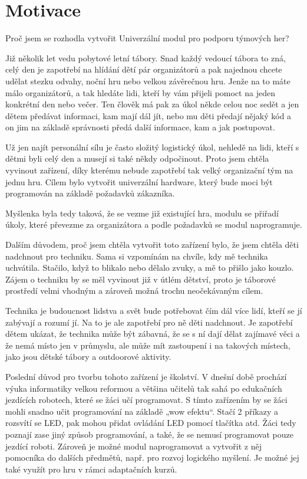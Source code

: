 \chapter{Motivace}
Proč jsem se rozhodla vytvořit Univerzální modul pro podporu týmových her? 

Již několik let vedu pobytové letní tábory. Snad každý vedoucí tábora to zná, celý den je zapotřebí na hlídání dětí pár organizátorů 
a pak najednou chcete udělat stezku odvahy, noční hru nebo velkou závěrečnou hru. Jenže na to máte málo organizátorů, a tak hledáte lidi, 
kteří by vám přijeli pomoct na jeden konkrétní den nebo večer. Ten člověk má pak za úkol někde celou noc sedět a jen dětem předávat 
informaci, kam mají dál jít, nebo mu děti předají nějaký kód a on jim na základě správnosti předá další informace, kam a jak postupovat. 

Už jen najít personální sílu je často složitý logistický úkol, nehledě na lidi, kteří s dětmi byli celý den a musejí si také někdy 
odpočinout. Proto jsem chtěla vyvinout zařízení, díky kterému nebude zapotřebí tak velký organizační tým na jednu hru. Cílem bylo vytvořit 
univerzální hardware, který bude moci být programován na základě požadavků zákazníka. 

Myšlenka byla tedy taková, že se vezme již existující hra, modulu se přiřadí úkoly, které převezme za organizátora a podle požadavků se 
 modul naprogramuje. 

Dalším důvodem, proč jsem chtěla vytvořit toto zařízení bylo, že jsem chtěla děti nadchnout pro techniku. Sama si vzpomínám na chvíle, kdy
mě technika uchvátila. Stačilo, když to blikalo nebo dělalo zvuky, a mě to přišlo jako kouzlo. Zájem o techniku by se měl vyvinout již v útlém 
dětství, proto je táborové prostředí velmi vhodným a zároveň možná trochu neočekávaným cílem. 

Technika je budoucnost lidstva a svět bude potřebovat čím dál více lidí, kteří se jí zabývají a rozumí jí. Na to je ale zapotřebí pro ně děti 
nadchnout. Je zapotřebí dětem ukázat, že technika může být zábavná, že se s ní dají dělat zajímavé věci a že nemá místo jen v průmyslu, ale může 
mít zastoupení i na takových místech, jako jsou dětské tábory a outdoorové aktivity.  

Poslední důvod pro tvorbu tohoto zařízení je školství. V dnešní době prochází výuka informatiky velkou reformou a většina učitelů tak sahá po 
edukačních jezdících robotech, které se žáci učí programovat. S tímto zařízením by se žáci mohli snadno učit programování na základě „wow efektu“. 
Stačí 2 příkazy a rozsvítí se LED, pak mohou přidat ovládání LED pomocí tlačítka atd. Žáci tedy poznají zase jiný způsob programování, a také, že 
se nemusí programovat pouze jezdící roboti. Zároveň je možné modul naprogramovat a vytvořit z něj pomocníka do dalších předmětů, např. pro rozvoj 
logického myšlení. Je možné jej také využít pro hru v rámci adaptačních kurzů. 

